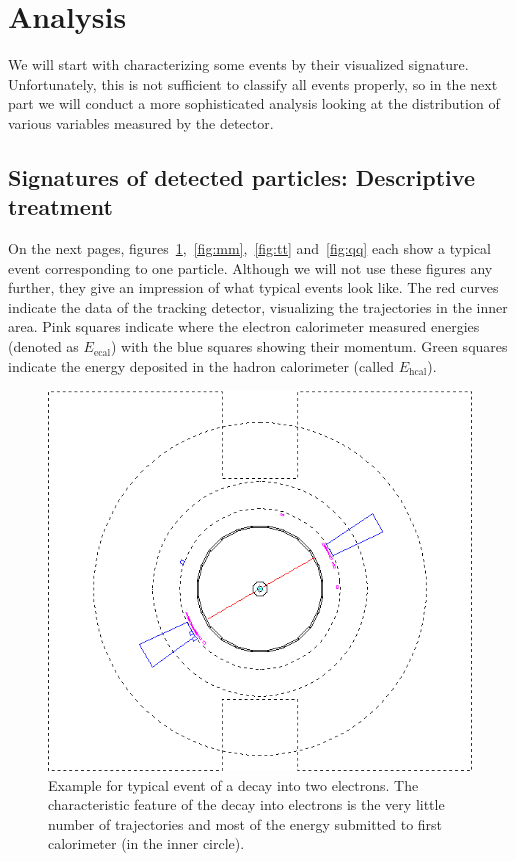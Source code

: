 \section{Analysis}
We will start with characterizing some events by their visualized signature. Unfortunately, this is not sufficient to classify all events
properly, so in the next part we will conduct a more sophisticated analysis looking at the distribution of various variables 
measured by the detector. 

\subsection{Signatures of detected particles: Descriptive treatment}
On the next pages, figures~\ref{fig:ee},~\ref{fig:mm},~\ref{fig:tt} and~\ref{fig:qq} each show
a typical event corresponding to one particle. Although we will not use these figures any
further, they give an impression of what typical events look like.
The red curves indicate the data of the tracking detector, visualizing the trajectories
in the inner area. Pink squares indicate where the electron calorimeter measured energies
(denoted as $E_{\mathrm{ecal}}$)
with the blue squares showing their momentum. Green squares indicate the energy deposited in the
hadron calorimeter (called $E_{\mathrm{hcal}}$).

\begin{figure}[htpb]
    \centering
    \includegraphics[width=0.8\linewidth]{figures/ee_02.png}
    \caption{Example for typical event of a decay into two electrons. The characteristic feature of the decay into electrons is
    the very little number of trajectories and most of the energy submitted to first calorimeter (in the inner circle).}
\label{fig:ee}
\end{figure}

